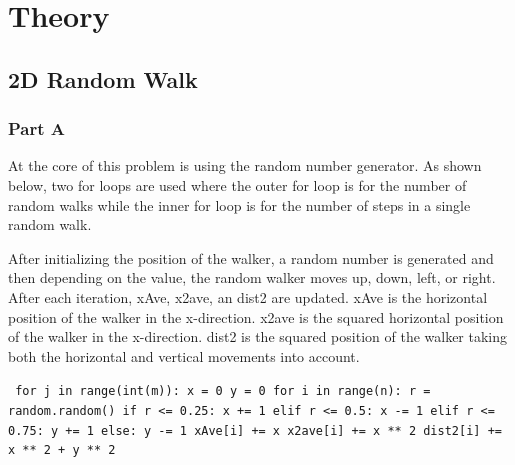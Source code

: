 \documentclass[notitlepage,aps,prd,nofootinbib]{revtex4-1}
\begin{document}
\section{Theory}
\label{sec:theory}
\subsection{2D Random Walk}
\label{subsec:theory_1}

\subsubsection{Part A}

At the core of this problem is using the random number generator. As shown below, two for loops are used where the outer for loop is for the number of random walks while the inner for loop is for the number of steps in a single random walk. 

After initializing the position of the walker, a random number is generated and then depending on the value, the random walker moves up, down, left, or right. After each iteration, xAve, x2ave, an dist2 are updated. xAve is the horizontal position of the walker in the x-direction. x2ave is the squared horizontal position of the walker in the x-direction. dist2 is the squared position of the walker taking both the horizontal and vertical movements into account. 
 

{\tt 	
\noindent for j in range(int(m)):           \newline
\indent x = 0                           \newline           
\indent	y = 0                                   \newline        
	\indent	for i in range(n):                  \newline
\indent	\indent	r = random.random()             \newline
\indent	\indent	if r <= 0.25:                           \newline
\indent	\indent \indent	x += 1                                  \newline
\indent	\indent	elif r <= 0.5:                          \newline
\indent	\indent \indent	x -= 1                                  \newline
\indent	\indent	elif r <= 0.75:                         \newline
\indent	\indent \indent	y += 1                                  \newline
\indent	\indent	else:                                   \newline
\indent	\indent \indent	y -= 1                                  \newline
\indent	\indent	xAve[i] += x                            \newline               
\indent	\indent	x2ave[i] += x ** 2                      \newline
\indent	\indent	dist2[i] += x ** 2 + y ** 2             \newline
		}
\end{document}
